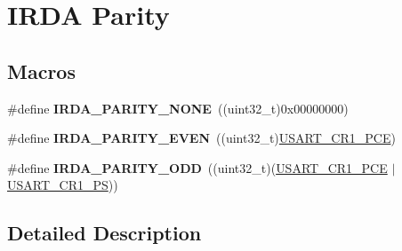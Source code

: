 \hypertarget{group___i_r_d_a___parity}{}\section{I\+R\+DA Parity}
\label{group___i_r_d_a___parity}
\subsection*{Macros}
\begin{DoxyCompactItemize}
\item 
\#define {\bfseries I\+R\+D\+A\+\_\+\+P\+A\+R\+I\+T\+Y\+\_\+\+N\+O\+NE}~((uint32\+\_\+t)0x00000000)\hypertarget{group___i_r_d_a___parity_ga930d90dc494068f6e8fd34c2008af6c3}{}\label{group___i_r_d_a___parity_ga930d90dc494068f6e8fd34c2008af6c3}

\item 
\#define {\bfseries I\+R\+D\+A\+\_\+\+P\+A\+R\+I\+T\+Y\+\_\+\+E\+V\+EN}~((uint32\+\_\+t)\hyperlink{group___peripheral___registers___bits___definition_ga60f8fcf084f9a8514efafb617c70b074}{U\+S\+A\+R\+T\+\_\+\+C\+R1\+\_\+\+P\+CE})\hypertarget{group___i_r_d_a___parity_ga1fa76c44ce474adc0d277d849217cc95}{}\label{group___i_r_d_a___parity_ga1fa76c44ce474adc0d277d849217cc95}

\item 
\#define {\bfseries I\+R\+D\+A\+\_\+\+P\+A\+R\+I\+T\+Y\+\_\+\+O\+DD}~((uint32\+\_\+t)(\hyperlink{group___peripheral___registers___bits___definition_ga60f8fcf084f9a8514efafb617c70b074}{U\+S\+A\+R\+T\+\_\+\+C\+R1\+\_\+\+P\+CE} $\vert$ \hyperlink{group___peripheral___registers___bits___definition_ga2e159d36ab2c93a2c1942df60e9eebbe}{U\+S\+A\+R\+T\+\_\+\+C\+R1\+\_\+\+PS}))\hypertarget{group___i_r_d_a___parity_ga64282fa5873f188bb26429bbc88bf040}{}\label{group___i_r_d_a___parity_ga64282fa5873f188bb26429bbc88bf040}

\end{DoxyCompactItemize}


\subsection{Detailed Description}
